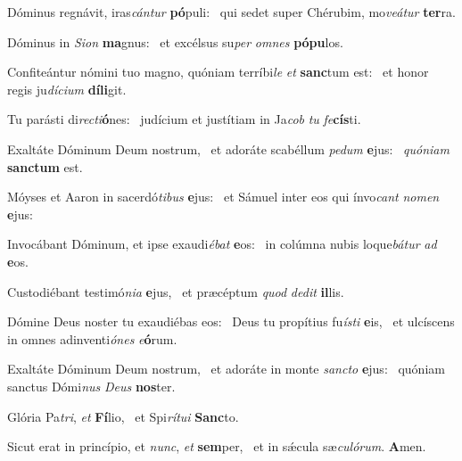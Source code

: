\item Dóminus regnávit, iras\textit{cántur} \textbf{pó}puli:~\psstar{} qui sedet super Chérubim, mo\textit{veátur} \textbf{ter}ra.
\item Dóminus in \textit{Sion} \textbf{ma}gnus:~\psstar{} et excélsus su\textit{per} \textit{omnes} \textbf{pó}\textbf{pu}los.
\item Confiteántur nómini tuo magno, quóniam terríbi\textit{le} \textit{et} \textbf{sanc}tum est:~\psstar{} et honor regis ju\textit{dícium} \textbf{dí}\textbf{li}git.
\item Tu parásti di\textit{recti}\textbf{ó}nes:~\psstar{} judícium et justítiam in Ja\textit{cob} \textit{tu} \textit{fe}\textbf{cís}ti.
\item Exaltáte Dóminum Deum nostrum,~\pscross{} et adoráte scabéllum \textit{pedum} \textbf{e}jus:~\psstar{} \textit{quóniam} \textbf{sanc}\textbf{tum} est.
\item Móyses et Aaron in sacerdó\textit{tibus} \textbf{e}jus:~\psstar{} et Sámuel inter eos qui ínvo\textit{cant} \textit{nomen} \textbf{e}jus:
\item Invocábant Dóminum, et ipse exaudi\textit{ébat} \textbf{e}os:~\psstar{} in colúmna nubis loque\textit{bátur} \textit{ad} \textbf{e}os.
\item Custodiébant testimó\textit{nia} \textbf{e}jus,~\psstar{} et præcéptum \textit{quod} \textit{dedit} \textbf{il}lis.
\item Dómine Deus noster tu exaudiébas eos:~\pscross{} Deus tu propítius fu\textit{ísti} \textbf{e}is,~\psstar{} et ulcíscens in omnes adinventi\textit{ónes} \textit{e}\textbf{ó}rum.
\item Exaltáte Dóminum Deum nostrum,~\pscross{} et adoráte in monte \textit{sancto} \textbf{e}jus:~\psstar{} quóniam sanctus Dómi\textit{nus} \textit{Deus} \textbf{nos}ter.
\item Glória Pa\textit{tri}, \textit{et} \textbf{Fí}lio,~\psstar{} et Spi\textit{rítui} \textbf{Sanc}to.
\item Sicut erat in princípio, et \textit{nunc}, \textit{et} \textbf{sem}per,~\psstar{} et in sǽcula sæ\textit{culórum}. \textbf{A}men.
